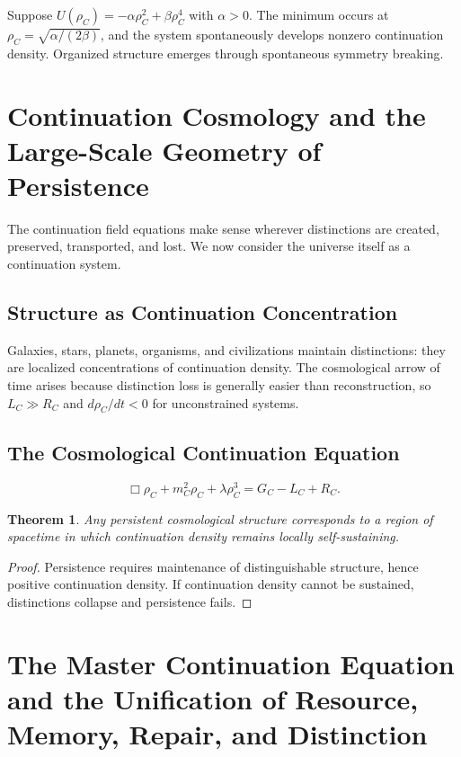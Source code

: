 \documentclass[12pt,a4paper]{article}
\newtheorem{theorem}{Theorem}[section]
\begin{document}
Suppose $U(\rho_C) = -\alpha\rho_C^2 + \beta\rho_C^4$ with $\alpha > 0$. The minimum occurs at $\rho_C = \sqrt{\alpha/(2\beta)}$, and the system spontaneously develops nonzero continuation density. Organized structure emerges through spontaneous symmetry breaking.

\section{Continuation Cosmology and the Large-Scale Geometry of Persistence}

The continuation field equations make sense wherever distinctions are created, preserved, transported, and lost. We now consider the universe itself as a continuation system.

\subsection{Structure as Continuation Concentration}

Galaxies, stars, planets, organisms, and civilizations maintain distinctions: they are localized concentrations of continuation density. The cosmological arrow of time arises because distinction loss is generally easier than reconstruction, so $L_C \gg R_C$ and $d\rho_C/dt < 0$ for unconstrained systems.

\subsection{The Cosmological Continuation Equation}

\[
\Box\rho_C + m_C^2\rho_C + \lambda\rho_C^3 = G_C - L_C + R_C.
\]

\begin{theorem}
Any persistent cosmological structure corresponds to a region of spacetime in which continuation density remains locally self-sustaining.
\end{theorem}

\begin{proof}
Persistence requires maintenance of distinguishable structure, hence positive continuation density. If continuation density cannot be sustained, distinctions collapse and persistence fails.
\end{proof}

\section{The Master Continuation Equation and the Unification of Resource, Memory, Repair, and Distinction}
\end{document}

